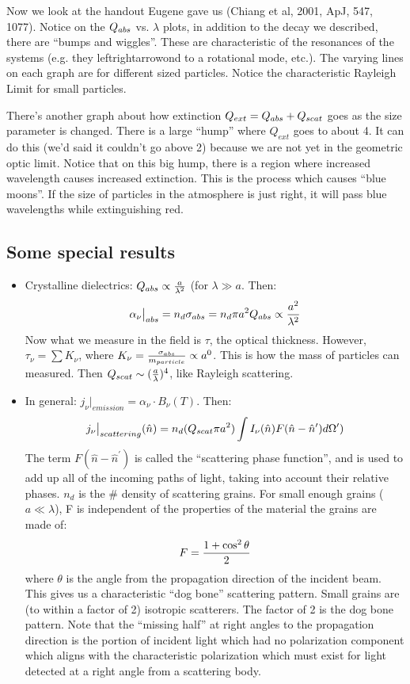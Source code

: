 \documentclass[11pt]{article}
\def\^{\hat}
\def\eval#1{\big|_{#1}}
\begin{document}
Now we look at the handout Eugene gave us (Chiang et al, 2001, ApJ, 547, 1077).
Notice on the $Q_{abs}$ vs. $\lambda$ plots, in addition to the decay we
described, there are ``bumps and wiggles''.  These are characteristic of the
resonances of the systems (e.g. they leftrightarrowond to a rotational mode, etc.).
The varying lines on each graph are for different sized particles.  Notice the
characteristic Rayleigh Limit for small particles. \par

\def\qext{Q_{ext}}
There's another graph about how extinction $\qext = \qabs + \qscat$ goes as
the size parameter is changed.  There is a large ``hump'' where $\qext$ goes to
about 4.  It can do this (we'd said it couldn't go above 2) because we are not
yet in the geometric optic limit.  Notice that on this big hump, there is a
region where increased wavelength causes increased extinction.  This is the
process which causes ``blue moons''.  If the size of particles in the atmosphere
is just right, it will pass blue wavelengths while extinguishing red.\par

\subsection*{ Some special results}

\def\sabs{\sigma_{abs}}
\begin{itemize}
\item  Crystalline dielectrics: $Q_{abs} \propto {a\over \lambda^2}$ (for
$\lambda \gg a$.  Then:
$$\alpha_\nu \eval{abs} = n_d\sabs = n_d\pi a^2\qabs
\propto {a^2\over \lambda^2}$$
Now what we measure in the field is $\tau$, the
optical thickness.  However, $\tau_\nu = \sum{K_\nu}$, where $K_\nu = 
{\sabs \over m_{particle}} \propto a^0$.  This is how the mass of 
particles can measured. Then $Q_{scat} \sim ({a\over \lambda})^4$, like
Rayleigh scattering.
\item  In general: $j_\nu\eval{emission} = \alpha_\nu \cdot B_\nu(T)$.
Then:
$$j_\nu\eval{scattering}(\^n) = n_d(\qscat\pi a^2)\int{I_\nu(\^n)
F(\^n-\^n^\prime)d\Omega^\prime)}$$
The term $F(\^n - \^n^\prime)$ is called the ``scattering phase function'', and
is used to add up all of the incoming paths of light, taking into account their
relative phases.  $n_d$ is the \# density of scattering grains.  For small
enough grains ($a\ll \lambda$), F is independent of the properties of the
material the grains are made of:
$$F = {1+\cos^2\theta\over 2}$$
where $\theta$ is the angle from the propagation direction of the incident beam.
This gives us a characteristic ``dog bone'' scattering pattern. Small grains
are (to within a factor of 2) isotropic scatterers.  The factor of 2 is the 
dog bone pattern.  Note that the ``missing half'' at right angles to the
propagation direction is the portion of incident light which had no polarization
component which aligns with the characteristic polarization which must exist
for light detected at a right angle from a scattering body.
\end{itemize}
\end{document}
